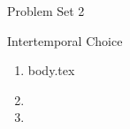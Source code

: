 \documentclass{handout}
\begin{document}
\centerline{\Large Problem Set 2}
\centerline{\large Intertemporal Choice}

\begin{enumerate} 

\item  {body.tex}
\item 
\item 


\end{enumerate}



\end{document}
